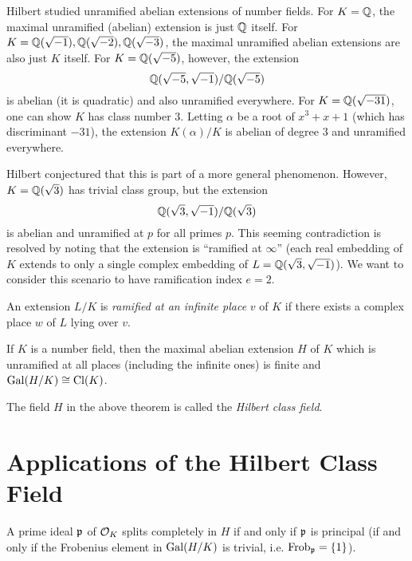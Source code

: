 \begin{example}
  Hilbert studied unramified abelian
  extensions of number fields. For
  $K = \mathbb{Q}$, the maximal unramified (abelian)
  extension is just $\mathbb{Q}$ itself.
  For $K = \mathbb{Q}(\sqrt{-1}), \mathbb{Q}(\sqrt{-2}), \mathbb{Q}(\sqrt{-3})$,
  the maximal unramified abelian extensions
  are also just $K$ itself. For $K = \mathbb{Q}(\sqrt{-5})$, however,
  the extension
  \[
    \mathbb{Q}(\sqrt{-5}, \sqrt{-1}) / \mathbb{Q}(\sqrt{-5})
  \]
  is abelian (it is quadratic) and also
  unramified everywhere.
  For $K = \mathbb{Q}(\sqrt{-31})$, one can show
  $K$ has class number $3$. Letting
  $\alpha$ be a root of $x^3 + x + 1$ (which
  has discriminant $-31$), the extension
  $K(\alpha) / K$
  is abelian of degree $3$ and unramified
  everywhere.

  Hilbert conjectured that
  this is part of a more general phenomenon.
  However, $K = \mathbb{Q}(\sqrt{3})$
  has trivial class group, but the extension
  \[
    \mathbb{Q}(\sqrt{3}, \sqrt{-1}) / \mathbb{Q}(\sqrt{3})
  \]
  is abelian and unramified at $p$ for all
  primes $p$. This seeming contradiction is
  resolved by noting that the extension is
  ``ramified at $\infty$'' (each real embedding
  of $K$ extends to only a single complex
  embedding of $L = \mathbb{Q}(\sqrt{3}, \sqrt{-1})$).
  We want to consider this scenario to have
  ramification index $e = 2$.
\end{example}

\begin{definition}
  An extension $L / K$ is \emph{ramified
  at an infinite place} $v$ of $K$ if
  there exists a complex place $w$ of $L$
  lying over $v$.
\end{definition}

\begin{theorem}[Hilbert?]
  If $K$ is a number field, then the maximal
  abelian extension $H$ of $K$ which is
  unramified at all places (including the
  infinite ones)  is finite and
  $\operatorname{Gal}(H / K) \cong \operatorname{Cl}(K)$.
\end{theorem}

\begin{definition}
  The field $H$ in the above theorem is
  called the \emph{Hilbert class field}.
\end{definition}

\section{Applications of the Hilbert Class Field}
\begin{theorem}
  A prime ideal $\mathfrak{p}$ of $\mathcal{O}_K$ splits
  completely in $H$ if and only if $\mathfrak{p}$ is
  principal (if and only if
  the Frobenius element in $\operatorname{Gal}(H / K)$
  is trivial, i.e. $\operatorname{Frob}_{\mathfrak{p}} = \{1\}$).
\end{theorem}

